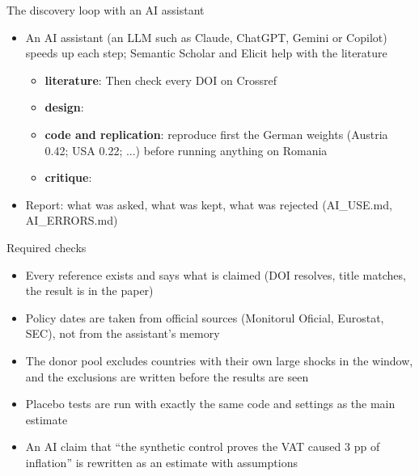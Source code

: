 \begin{frame}{The discovery loop with an AI assistant}
\itemsize{\footnotesize}
\begin{itemize}
    \item An AI assistant (an LLM such as Claude, ChatGPT, Gemini or Copilot) speeds up each step; Semantic Scholar and Elicit help with the literature
    \begin{itemize}
        \item \textbf{literature}:  Then check every DOI on Crossref
        \item \textbf{design}: 
        \item \textbf{code and replication}: reproduce first the German weights (Austria 0.42; USA 0.22; ...) before running anything on Romania
        \item \textbf{critique}: 
    \end{itemize}
    \item Report: what was asked, what was kept, what was rejected (AI\_USE.md, AI\_ERRORS.md)
\end{itemize}
\end{frame}

\begin{frame}{Required checks}
\itemsize{\small}
\begin{itemize}
    \item Every reference exists and says what is claimed (DOI resolves, title matches, the result is in the paper)
    \item Policy dates are taken from official sources (Monitorul Oficial, Eurostat, SEC), not from the assistant's memory
    \item The donor pool excludes countries with their own large shocks in the window, and the exclusions are written before the results are seen
    \item Placebo tests are run with exactly the same code and settings as the main estimate
    \item An AI claim that ``the synthetic control proves the VAT caused 3 pp of inflation'' is rewritten as an estimate with assumptions
\end{itemize}
\end{frame}

